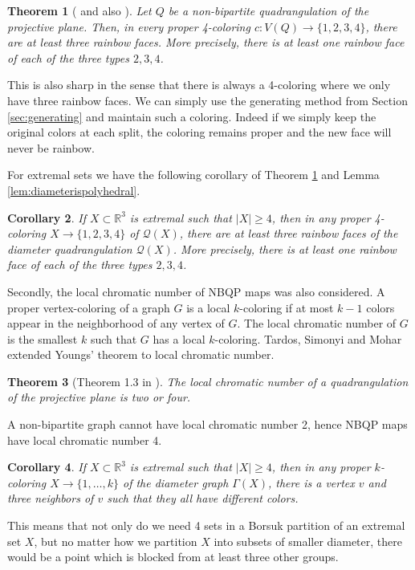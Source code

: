 \documentclass{article}
\newtheorem{theorem}{Theorem}[section]
\newtheorem{corollary}[theorem]{Corollary}
\newcommand{\R}[0]{\mathbb{R}}
\newcommand{\qt}{\mathcal{Q}}
\begin{document}
\begin{theorem}[\cite{mohar2006quadrangulations} and also \cite{KaiserLoNakamotoNozakiOzeki2025}]\label{thm:bettercol}
Let $Q$ be a non-bipartite quadrangulation of the projective plane. Then, in every proper 4-coloring $c:V(Q)\to\{1,2,3,4\}$, there are at least three rainbow faces. More precisely, there is at least one rainbow face of each of the three types $2,3,4$.
\end{theorem}

This is also sharp in the sense that there is always a 4-coloring where we only have three rainbow faces. We can simply use the generating method from Section \ref{sec:generating} and maintain such a coloring. Indeed if we simply keep the original colors at each split, the coloring remains proper and the new face will never be rainbow.  

For extremal sets we have the following corollary of Theorem \ref{thm:bettercol} and Lemma \ref{lem:diameterispolyhedral}. 

\begin{corollary}
    If $X\subset \R^3$ is extremal such that $|X|\ge 4$, then in any proper 4-coloring $X\to\{1,2,3,4\}$ of $\qt(X)$, there are at least three rainbow faces of the diameter quadrangulation $\qt(X)$. More precisely, there is at least one rainbow face of each of the three types $2,3,4$.
\end{corollary}

Secondly, the local chromatic number of NBQP maps was also considered. A proper vertex-coloring of a graph $G$ is a local $k$-coloring if at most $k-1$ colors appear in the neighborhood of any vertex of $G$. The local chromatic number of $G$ is the smallest $k$ such that $G$ has a local $k$-coloring. Tardos, Simonyi and Mohar extended Youngs' theorem to local chromatic number.


\begin{theorem}[Theorem 1.3 in \cite{mohar2013local}]
    The local chromatic number of a quadrangulation of the projective plane is two or four.
\end{theorem}

A non-bipartite graph cannot have local chromatic number 2, hence NBQP maps have local chromatic number 4. 

\begin{corollary}
     If $X\subset \R^3$ is extremal such that $|X|\ge 4$, then in any proper $k$-coloring $X\to\{1,\dots, k\}$ of the diameter graph $\Gamma(X)$, there is a vertex $v$ and three neighbors of $v$ such that they all have different colors. 
\end{corollary}
This means that not only do we need 4 sets in a Borsuk partition of an extremal set $X$, but no matter how we partition $X$ into subsets of smaller diameter, there would be a point which is blocked from at least three other groups. 
\end{document}
